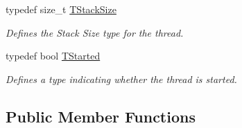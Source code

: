 \begin{DoxyCompactItemize}
typedef size\-\_\-t \hyperlink{class_thread_base_af45bd74387b409e15989f7eddbaf3718}{T\-Stack\-Size}
\begin{DoxyCompactList}\small\item\em Defines the Stack Size type for the thread. \end{DoxyCompactList}\item 
typedef bool \hyperlink{class_thread_base_ad8b410e3bc7320addea3c5b56ff6c985}{T\-Started}
\begin{DoxyCompactList}\small\item\em Defines a type indicating whether the thread is started. \end{DoxyCompactList}\end{DoxyCompactItemize}
\subsection*{Public Member Functions}
